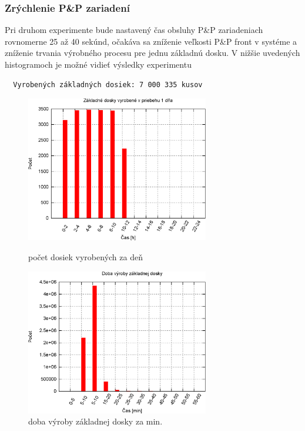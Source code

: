 \documentclass[12pt,a4paper,titlepage,final]{article}
\begin{document}
\newpage

\subsubsection{Zrýchlenie P\&P zariadení}
Pri druhom experimente bude nastavený čas obsluhy P\&P zariadeniach 
rovnomerne 25 až 40 sekúnd, očakáva sa zníženie veľkosti P\&P front v systéme
a zníženie trvania výrobného procesu pre jednu základnú dosku.
V nižšie uvedených histogramoch je možné vidieť výsledky experimentu 

\begin{verbatim}
  Vyrobených základných dosiek: 7 000 335 kusov
\end{verbatim}

\begin{figure}[!ht]
  \centering
  \begin{minipage}{0.45\linewidth}
  \centering
  \includegraphics[width=8cm]{doc/2_hist1.eps}
  \caption{počet dosiek vyrobených za deň}
  \end{minipage}
  \quad
  \begin{minipage}{0.45\linewidth}
    \centering
    \includegraphics[width=8cm]{doc/2_hist2.eps}
    \caption{doba výroby základnej dosky za min.}
  \end{minipage}
\end{figure}
\end{document}
